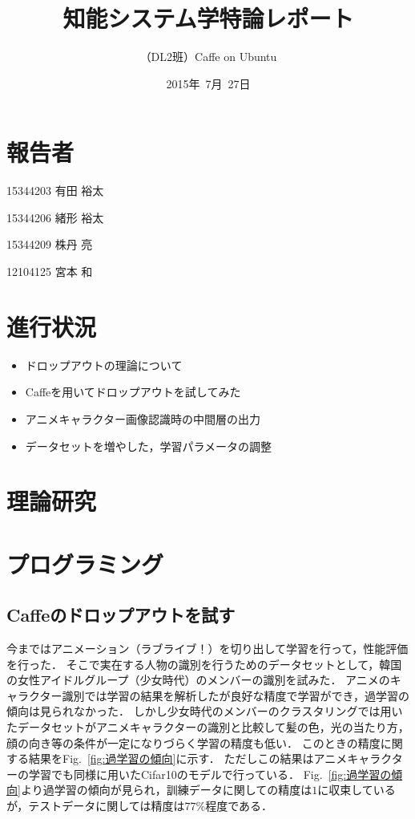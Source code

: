 \documentclass[a4paper,10pt]{jsarticle}
\title{知能システム学特論レポート}
\author{
（DL2班）Caffe on Ubuntu\\
}
\date{2015年\ 7月\ 27日}
\begin{document}
\maketitle
\section{報告者}
\begin{list}{}{}
 \item 15344203\hspace{0.5cm} 有田 裕太
 \item 15344206\hspace{0.5cm} 緒形 裕太
 \item 15344209\hspace{0.5cm} 株丹 亮
 \item 12104125\hspace{0.5cm} 宮本 和
\end{list}

\section{進行状況}

\begin{itemize}
\item ドロップアウトの理論について
\item Caffeを用いてドロップアウトを試してみた
\item アニメキャラクター画像認識時の中間層の出力
\item データセットを増やした，学習パラメータの調整 
\end{itemize}

\section{理論研究}


\section{プログラミング}
\subsection{Caffeのドロップアウトを試す}
今まではアニメーション（ラブライブ！）を切り出して学習を行って，性能評価を行った．
そこで実在する人物の識別を行うためのデータセットとして，韓国の女性アイドルグループ（少女時代）のメンバーの識別を試みた．
アニメのキャラクター識別では学習の結果を解析したが良好な精度で学習ができ，過学習の傾向は見られなかった．
しかし少女時代のメンバーのクラスタリングでは用いたデータセットがアニメキャラクターの識別と比較して髪の色，光の当たり方，顔の向き等の条件が一定になりづらく学習の精度も低い．
このときの精度に関する結果をFig.~\ref{fig:過学習の傾向}に示す．
ただしこの結果はアニメキャラクターの学習でも同様に用いたCifar10のモデルで行っている．
Fig.~\ref{fig:過学習の傾向}より過学習の傾向が見られ，訓練データに関しての精度は$1$に収束しているが，テストデータに関しては精度は$77\%$程度である．
\end{document}

